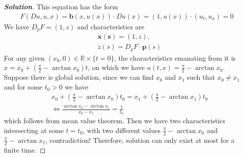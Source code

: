 \documentclass[11pt,reqno]{amsart}
\newcommand{\R}{\mathbb{R}}
\newcommand{\<}{\langle}
\renewcommand{\>}{\rangle}
\begin{document}
\begin{enumerate}[label={\arabic*.}]
\begin{proof}[\bf{Solution}]
This equation has the form 
\begin{align*}
F(Du, u, x) = \mathbf{b}(x, u(x))\cdot Du(x) = (1, u(x))\cdot (u_t, u_x) = 0
\end{align*}
We have $D_p F= (1,z)$ and characteristics are 
\begin{align*}
& \mathbf{\dot{x}(s)} = (1,z),\\
& \dot{z}(s) =D_p F\cdot \mathbf{p}(s)
\end{align*}
For any given $(x_0, 0) \in \R \times \{t=0\}$, the characteristics emanating from it is $x=x_0 +  (\frac{\pi}{2} -\arctan x_0) t $, on which we have $u(t,x) = \frac{\pi}{2} - \arctan x_0$. Suppose there is global solution, since we can find $x_0$ and $x_1$ such that $x_0 \neq x_1$ and for some $t_0>0$ we have
\begin{align*}
&x_0 +  (\frac{\pi}{2} -\arctan x_0) t_0  = x_1 +  (\frac{\pi}{2} -\arctan x_1) t_0 \\
& \iff \frac{\arctan x_0 - \arctan x_1}{x_0 - x_1}  = \frac{1}{t_0}
\end{align*}
which follows from mean value theorem. Then we have two characteristics intersecting at some $t=t_0$, with two different values $\frac{\pi}{2} -\arctan x_0$ and $\frac{\pi}{2} - \arctan x_1$, contradiction! Therefore, solution can only exist at most for a finite time.
\end{proof}



\end{enumerate}
\end{document}
